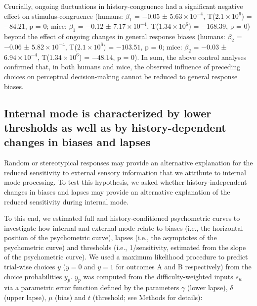 \documentclass[
]{article}
\begin{document}
Crucially, ongoing fluctuations in history-congruence had a significant
negative effect on stimulus-congruence (humans: \(\beta_1\) = \(-0.05\)
± \(\ensuremath{5.63\times 10^{-4}}\),
T(\(\ensuremath{2.1\times 10^{6}}\)) = \(-84.21\), p = \(0\); mice:
\(\beta_1\) = \(-0.12\) ± \(\ensuremath{7.17\times 10^{-4}}\),
T(\(\ensuremath{1.34\times 10^{6}}\)) = \(-168.39\), p = \(0\)) beyond
the effect of ongoing changes in general response biases (humans:
\(\beta_2\) = \(-0.06\) ± \(\ensuremath{5.82\times 10^{-4}}\),
T(\(\ensuremath{2.1\times 10^{6}}\)) = \(-103.51\), p = \(0\); mice:
\(\beta_2\) = \(-0.03\) ± \(\ensuremath{6.94\times 10^{-4}}\),
T(\(\ensuremath{1.34\times 10^{6}}\)) = \(-48.14\), p = \(0\)). In sum,
the above control analyses confirmed that, in both humans and mice, the
observed influence of preceding choices on perceptual decision-making
cannot be reduced to general response biases.

\hypertarget{internal-mode-is-characterized-by-lower-thresholds-as-well-as-by-history-dependent-changes-in-biases-and-lapses}{%
\subsection{Internal mode is characterized by lower thresholds as well
as by history-dependent changes in biases and
lapses}\label{internal-mode-is-characterized-by-lower-thresholds-as-well-as-by-history-dependent-changes-in-biases-and-lapses}}

Random or stereotypical responses may provide an alternative explanation
for the reduced sensitivity to external sensory information that we
attribute to internal mode processing. To test this hypothesis, we asked
whether history-independent changes in biases and lapses may provide an
alternative explanation of the reduced sensitivity during internal mode.

To this end, we estimated full and history-conditioned psychometric
curves to investigate how internal and external mode relate to biases
(i.e., the horizontal position of the psychometric curve), lapses (i.e.,
the asymptotes of the psychometric curve) and thresholds (i.e.,
1/sensitivity, estimated from the slope of the psychometric curve). We
used a maximum likelihood procedure to predict trial-wise choices \(y\)
(\(y = 0\) and \(y = 1\) for outcomes A and B respectively) from the
choice probabilities \(y_p\). \(y_p\) was computed from the
difficulty-weighted inputs \(s_w\) via a parametric error function
defined by the parameters \(\gamma\) (lower lapse), \(\delta\) (upper
lapse), \(\mu\) (bias) and \(t\) (threshold; see Methods for details):
\end{document}

